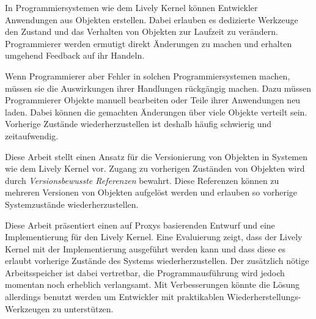 \begin{zusammenfassung}

In Programmiersystemen wie dem Lively Kernel können Entwickler Anwendungen aus Objekten erstellen.
Dabei erlauben es dedizierte Werkzeuge den Zustand und das Verhalten von Objekten zur Laufzeit zu verändern.
Programmierer werden ermutigt direkt Änderungen zu machen und erhalten umgehend Feedback auf ihr Handeln.

Wenn Programmierer aber Fehler in solchen Programmiersystemen machen, müssen sie die Auswirkungen ihrer Handlungen rückgängig machen.
Dazu müssen Programmierer Objekte manuell bearbeiten oder Teile ihrer Anwendungen neu laden.
Dabei können die gemachten Änderungen über viele Objekte verteilt sein.
Vorherige Zustände wiederherzustellen ist deshalb häufig schwierig und zeitaufwendig.

Diese Arbeit stellt einen Ansatz für die Versionierung von Objekten in Systemen wie dem Lively Kernel vor.
Zugang zu vorherigen Zuständen von Objekten wird durch \emph{Versionsbewusste Referenzen} bewahrt.
Diese Referenzen können zu mehreren Versionen von Objekten aufgelöst werden und erlauben so vorherige Systemzustände wiederherzustellen.

Diese Arbeit präsentiert einen auf Proxys basierenden Entwurf und eine Implementierung für den Lively Kernel.
Eine Evaluierung zeigt, dass der Lively Kernel mit der Implementierung ausgeführt werden kann und dass diese es erlaubt vorherige Zustände des Systems wiederherzustellen.
Der zusätzlich nötige Arbeitsspeicher ist dabei vertretbar, die Programmausführung wird jedoch momentan noch erheblich verlangsamt.
Mit Verbesserungen könnte die Lösung allerdings benutzt werden um Entwickler mit praktikablen Wiederherstellungs-Werkzeugen zu unterstützen.

\end{zusammenfassung}

